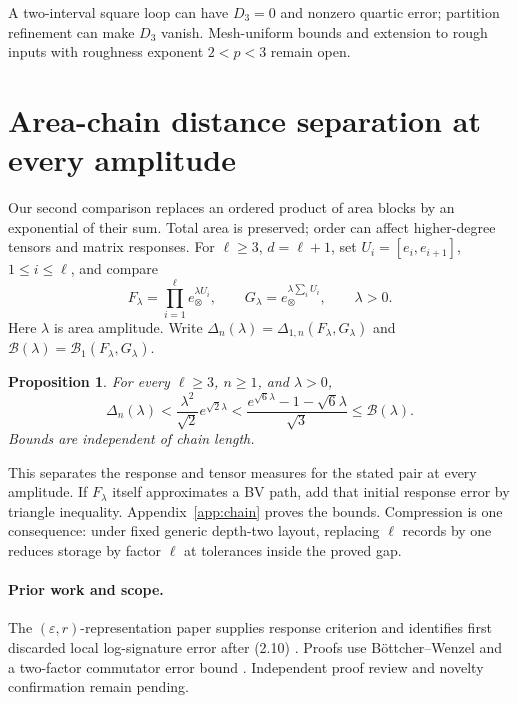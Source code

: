 \documentclass[11pt,a4paper]{article}
\newtheorem{proposition}{Proposition}
\newcommand{\B}{\mathcal B}
\newcommand{\Del}{\Delta}
\begin{document}
A two-interval square loop can have \(D_3=0\) and nonzero quartic error;
partition refinement can make \(D_3\) vanish. Mesh-uniform bounds and extension
to rough inputs with roughness exponent \(2<p<3\) remain open.

\section{Area-chain distance separation at every amplitude}
Our second comparison replaces an ordered product of area blocks by an
exponential of their sum. Total area is preserved; order can affect
higher-degree tensors and matrix responses.
For \(\ell\ge3\), \(d=\ell+1\), set \(U_i=[e_i,e_{i+1}]\),
\(1\le i\le\ell\), and compare
\[
 F_\lambda=\prod_{i=1}^\ell e_\otimes^{\lambda U_i},\qquad
 G_\lambda=e_\otimes^{\lambda\sum_iU_i},\qquad\lambda>0.
\]
Here \(\lambda\) is area amplitude. Write
\(\Del_n(\lambda)=\Del_{1,n}(F_\lambda,G_\lambda)\) and
\(\B(\lambda)=\B_1(F_\lambda,G_\lambda)\).

\begin{proposition}\label{prop:chain}
For every \(\ell\ge3\), \(n\ge1\), and \(\lambda>0\),
\begin{equation}\label{eq:chain}
 \Del_n(\lambda)
 <\frac{\lambda^2}{\sqrt2}e^{\sqrt2\lambda}
 <\frac{e^{\sqrt6\lambda}-1-\sqrt6\lambda}{\sqrt3}
 \le\B(\lambda).
\end{equation}
Bounds are independent of chain length.
\end{proposition}

This separates the response and tensor measures for the stated pair at every
amplitude. If \(F_\lambda\) itself approximates a BV path, add that initial
response error by triangle inequality. Appendix~\ref{app:chain} proves the bounds.
Compression is one consequence: under fixed generic depth-two layout,
replacing \(\ell\) records by one reduces storage by factor \(\ell\) at
tolerances inside the proved gap.

\paragraph{Prior work and scope.}
The \((\varepsilon,r)\)-representation paper supplies response criterion and
identifies first discarded local log-signature error after (2.10)
\cite{ferrucci2026concise}. Proofs use B\"ottcher--Wenzel
\cite{bottcher2008frobenius} and a two-factor commutator error bound
\cite{iserles2024elementary}. Independent proof review and novelty
confirmation remain pending.
\end{document}
